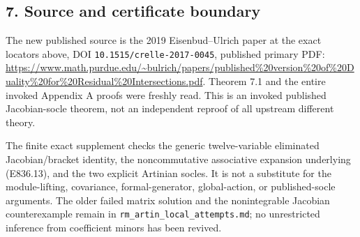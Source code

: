 \subsection{7. Source and certificate
boundary}\label{source-and-certificate-boundary}

The new published source is the 2019 Eisenbud--Ulrich paper at the exact
locators above, DOI \texttt{10.1515/crelle-2017-0045}, published primary
PDF:
\url{https://www.math.purdue.edu/~bulrich/papers/published\%20version\%20of\%20Duality\%20for\%20Residual\%20Intersections.pdf}.
Theorem 7.1 and the entire invoked Appendix A proofs were freshly read.
This is an invoked published Jacobian-socle theorem, not an independent
reproof of all upstream different theory.

The finite exact supplement checks the generic twelve-variable
eliminated Jacobian/bracket identity, the noncommutative associative
expansion underlying (E836.13), and the two explicit Artinian socles. It
is not a substitute for the module-lifting, covariance,
formal-generator, global-action, or published-socle arguments. The older
failed matrix solution and the nonintegrable Jacobian counterexample
remain in \texttt{rm\_artin\_local\_attempts.md}; no unrestricted
inference from coefficient minors has been revived.
